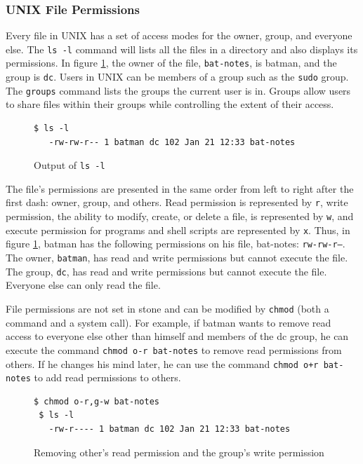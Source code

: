 \documentclass[11pt]{article}
\begin{document}
\subsubsection{\textsc{UNIX} File Permissions}

Every file in \textsc{UNIX} has a set of access modes for the owner,
group, and everyone else. The \texttt{ls -l} command will lists all the
files in a directory and also displays its permissions.  In figure
\ref{batPerm}, the owner of the file, \texttt{bat-notes}, is batman, and
the group is \texttt{dc}. Users in \textsc{UNIX} can be members of a
group such as the \texttt{sudo} group. The \texttt{groups} command
lists the groups the current user is in. Groups allow users to share
files within their groups while controlling the extent of their access.

\begin{figure}[h]
\begin{centering}
  \begin{lstlisting}[style=bashstyle]
 $ ls -l
   -rw-rw-r-- 1 batman dc 102 Jan 21 12:33 bat-notes\end{lstlisting}
  \caption{Output of \texttt{ls -l}}
  \label{batPerm}
\end{centering}
\end{figure}

The file's permissions are presented in the same order from left to
right after the first dash: owner, group, and others.  Read permission
is represented by \texttt{r}, write permission, the ability to modify,
create, or delete a file, is represented by \texttt{w}, and execute
permission for programs and shell scripts are represented by \texttt{x}.
Thus, in figure \ref{batPerm}, batman has the following permissions on
his file, bat-notes: \texttt{rw-rw-r--}. The owner, \texttt{batman}, has
read and write permissions but cannot execute the file. The group,
\texttt{dc}, has read and write permissions but cannot execute the file.
Everyone else can only read the file.

File permissions are not set in stone and can be modified by
\texttt{chmod} (both a command and a system call).  For example, if
batman wants to remove read access to everyone else other than himself
and members of the dc group, he can execute the command \texttt{chmod
o-r bat-notes} to remove read permissions from others. If he changes his
mind later, he can use the command \texttt{chmod o+r bat-notes} to add
read permissions to others.

\begin{figure}[h]
\begin{centering}
  \begin{lstlisting}[style=bashstyle]
 $ chmod o-r,g-w bat-notes
 $ ls -l
   -rw-r---- 1 batman dc 102 Jan 21 12:33 bat-notes\end{lstlisting}
  \caption{Removing other's read permission and the group's write permission}
  \label{batPerm1}
\end{centering}
\end{figure}
\end{document}
